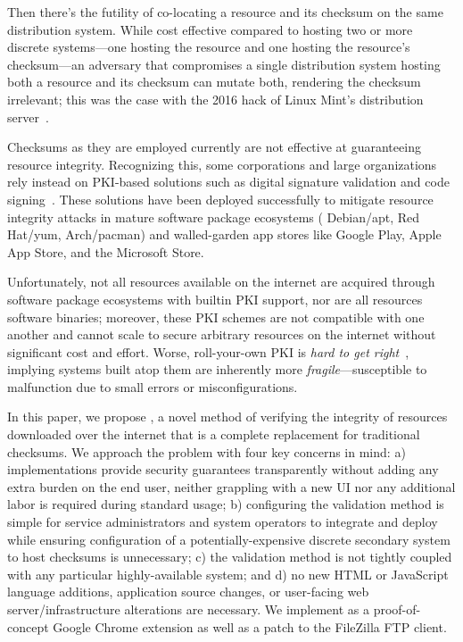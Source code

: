 Then there's the futility of co-locating a resource and its checksum on the same
distribution system. While cost effective compared to hosting two or more
discrete systems---one hosting the resource and one hosting the resource's
checksum---an adversary that compromises a single distribution system hosting
both a resource and its checksum can mutate both, rendering the checksum
irrelevant; this was the case with the 2016 hack of Linux Mint's distribution
server~\cite{SCA-MINT1, SCA-MINT2}.

Checksums as they are employed currently are not effective at guaranteeing
resource integrity. Recognizing this, some corporations and large organizations
rely instead on PKI-based solutions such as digital signature validation and
code signing~\cite{PKI}. These solutions have been deployed successfully to
mitigate resource integrity attacks in mature software package ecosystems (\eg
Debian/apt, Red Hat/yum, Arch/pacman) and walled-garden app stores like Google
Play, Apple App Store, and the Microsoft Store.


Unfortunately, not all resources available on the internet are acquired through
software package ecosystems with builtin PKI support, nor are all resources
software binaries; moreover, these PKI schemes are not compatible with one
another and cannot scale to secure arbitrary resources on the internet without
significant cost and effort. Worse, roll-your-own PKI is \emph{hard to get
right}~\cite{PKI}, implying systems built atop them are inherently more
\emph{fragile}---susceptible to malfunction due to small errors or
misconfigurations.

In this paper, we propose \SYSTEM{}, a novel method of verifying the integrity
of resources downloaded over the internet that is a complete replacement for
traditional checksums. We approach the problem with four key concerns in mind:
a) implementations provide security guarantees transparently without adding any
extra burden on the end user, \ie neither grappling with a new UI nor any
additional labor is required during standard usage; b) configuring the
validation method is simple for service administrators and system operators to
integrate and deploy while ensuring configuration of a potentially-expensive
discrete secondary system to host checksums is unnecessary; c) the validation
method is not tightly coupled with any particular highly-available system; and
d) no new HTML or JavaScript language additions, application source changes, or
user-facing web server/infrastructure alterations are necessary. We implement
\SYSTEM{} as a proof-of-concept Google Chrome extension as well as a patch to
the FileZilla FTP client.

